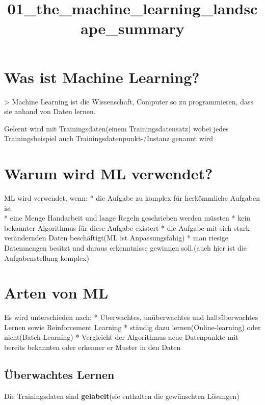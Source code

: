 \documentclass[11pt]{article}
\title{01\_the\_machine\_learning\_landscape\_summary}
\begin{document}
    
    
    \maketitle
    
    

    
    \section{Was ist Machine Learning?}\label{was-ist-machine-learning}

\textgreater{} Machine Learning ist die Wissenschaft, Computer so zu
programmieren, dass sie anhand von Daten lernen.

Gelernt wird mit Trainingsdaten(einem Trainingsdatensatz) wobei jedes
Trainingsbeispiel auch Trainingsdatenpunkt-/Instanz genannt wird

    \section{Warum wird ML verwendet?}\label{warum-wird-ml-verwendet}

ML wird verwendet, wenn: * die Aufgabe zu komplex für herkömmliche
Aufgaben ist\\
* eine Menge Handarbeit und lange Regeln geschrieben werden müssten *
kein bekannter Algorithmus für diese Aufgabe existert * die Aufgabe mit
sich stark verändernden Daten beschäftigt(ML ist Anpassungsfähig) * man
riesige Datenmengen besitzt und daraus erkenntnisse gewinnen soll.(auch
hier ist die Aufgabenstellung komplex)

    \section{Arten von ML}\label{arten-von-ml}

Es wird unterschieden nach: * Überwachtes, unüberwachtes und
halbüberwachtes Lernen sowie Reinforcement Learning * ständig dazu
lernen(Online-learning) oder nicht(Batch-Learning) * Vergleicht der
Algorithmus neue Datenpunkte mit bereits bekannten oder erkenner er
Muster in den Daten

    \subsection{Überwachtes Lernen}\label{uxfcberwachtes-lernen}

Die Trainingsdaten sind \textbf{gelabelt}(sie enthalten die gewünschten
Lösungen)
\end{document}
